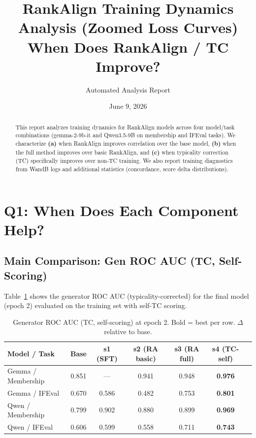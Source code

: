 \documentclass[11pt,a4paper]{article}
\title{RankAlign Training Dynamics Analysis (Zoomed Loss Curves)\\
\large When Does RankAlign / TC Improve?}
\author{Automated Analysis Report}
\date{June 9, 2026}
\begin{document}
\maketitle

\begin{abstract}
This report analyzes training dynamics for RankAlign models across four model/task combinations (gemma-2-9b-it and Qwen3.5-9B on membership and IFEval tasks). We characterize \textbf{(a)} when RankAlign improves correlation over the base model, \textbf{(b)} when the full method improves over basic RankAlign, and \textbf{(c)} when typicality correction (TC) specifically improves over non-TC training. We also report training diagnostics from WandB logs and additional statistics (concordance, score delta distributions).
\end{abstract}

\tableofcontents
\newpage

\section{Q1: When Does Each Component Help?}

\subsection{Main Comparison: Gen ROC AUC (TC, Self-Scoring)}

Table~\ref{tab:main_comparison} shows the generator ROC AUC (typicality-corrected) for the final model (epoch 2) evaluated on the training set with self-TC scoring.

\begin{table}[H]
\centering
\caption{Generator ROC AUC (TC, self-scoring) at epoch 2. Bold = best per row. $\Delta$ relative to base.}
\label{tab:main_comparison}
\begin{tabular}{lcccccc}
\toprule
\textbf{Model / Task} & \textbf{Base} & \textbf{s1 (SFT)} & \textbf{s2 (RA basic)} & \textbf{s3 (RA full)} & \textbf{s4 (TC-self)} \\
\midrule
Gemma / Membership & 0.851 & --- & 0.941 & 0.948 & \textbf{0.976} \\
Gemma / IFEval    & 0.670 & 0.586 & 0.482 & 0.753 & \textbf{0.801} \\
Qwen / Membership  & 0.799 & 0.902 & 0.880 & 0.899 & \textbf{0.969} \\
Qwen / IFEval     & 0.606 & 0.599 & 0.558 & 0.711 & \textbf{0.743} \\
\bottomrule
\end{tabular}
\end{table}
\end{document}
